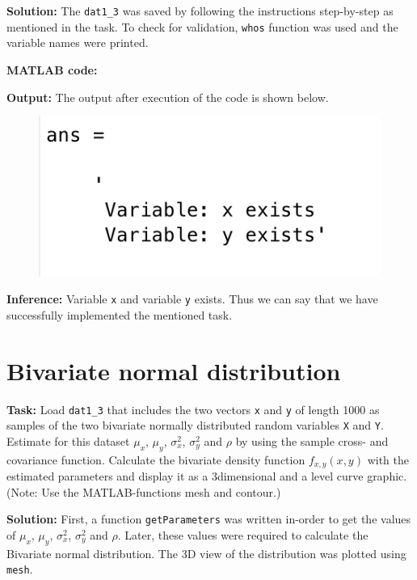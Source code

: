 \noindent \textbf{Solution:} The \texttt{dat1\_3} was saved by following the instructions step-by-step as mentioned in the task. To check for validation, \texttt{whos} function was used and the variable names were printed.

\noindent \textbf{MATLAB code:}


\noindent \textbf{Output:} The output after execution of the code is shown below.
\begin{figure}[H]
\centering
{\includegraphics[scale=0.58]{ass4_1.png}}
\end{figure}

\noindent \textbf{Inference:} Variable \texttt{x} and variable \texttt{y} exists. Thus we can say that we have successfully implemented the mentioned task.


\section{ Bivariate normal distribution } \label{ Bivariate normal distribution}
\noindent \textbf{Task:} Load \texttt{dat1\_3} that includes the two vectors \texttt{x} and \texttt{y} of length 1000 as samples of the two bivariate normally distributed random variables \texttt{X} and \texttt{Y}. Estimate for this dataset $\mu_x$, $\mu_y$, $\sigma_x^2$, $\sigma_y^2$  and $\rho$ by using the sample cross- and covariance function. Calculate the bivariate density function $f_{x,y}(x,y)$ with the estimated parameters and display it as a 3dimensional and a level curve graphic. (Note: Use the MATLAB-functions mesh and contour.) 
 
 \noindent \textbf{Solution:} First, a function \texttt{getParameters} was written in-order to get the values of $\mu_x$, $\mu_y$, $\sigma_x^2$, $\sigma_y^2$  and $\rho$. Later, these values were required to calculate the Bivariate normal distribution. The 3D view of the distribution was plotted using \texttt{mesh}.
 
